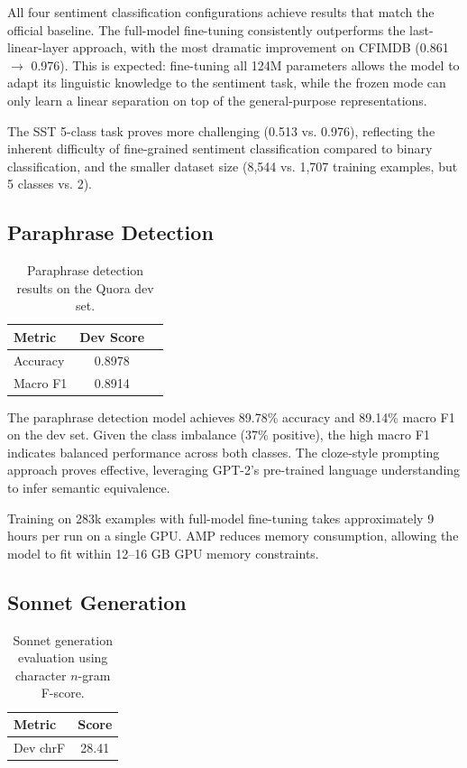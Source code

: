 \documentclass[11pt,a4paper]{article}
\begin{document}
All four sentiment classification configurations achieve results that match the official baseline. The full-model fine-tuning consistently outperforms the last-linear-layer approach, with the most dramatic improvement on CFIMDB (0.861 $\rightarrow$ 0.976). This is expected: fine-tuning all 124M parameters allows the model to adapt its linguistic knowledge to the sentiment task, while the frozen mode can only learn a linear separation on top of the general-purpose representations.

The SST 5-class task proves more challenging (0.513 vs. 0.976), reflecting the inherent difficulty of fine-grained sentiment classification compared to binary classification, and the smaller dataset size (8,544 vs. 1,707 training examples, but 5 classes vs. 2).

\subsection{Paraphrase Detection}

\begin{table}[H]
\centering
\begin{tabular}{lcc}
\toprule
\textbf{Metric} & \textbf{Dev Score} \\
\midrule
Accuracy & 0.8978 \\
Macro F1 & 0.8914 \\
\bottomrule
\end{tabular}
\caption{Paraphrase detection results on the Quora dev set.}
\label{tab:para-results}
\end{table}

The paraphrase detection model achieves 89.78\% accuracy and 89.14\% macro F1 on the dev set. Given the class imbalance (37\% positive), the high macro F1 indicates balanced performance across both classes. The cloze-style prompting approach proves effective, leveraging GPT-2's pre-trained language understanding to infer semantic equivalence.

Training on 283k examples with full-model fine-tuning takes approximately 9 hours per run on a single GPU. AMP reduces memory consumption, allowing the model to fit within 12--16 GB GPU memory constraints.

\subsection{Sonnet Generation}

\begin{table}[H]
\centering
\begin{tabular}{lc}
\toprule
\textbf{Metric} & \textbf{Score} \\
\midrule
Dev chrF & 28.41 \\
\bottomrule
\end{tabular}
\caption{Sonnet generation evaluation using character $n$-gram F-score.}
\label{tab:sonnet-results}
\end{table}
\end{document}
